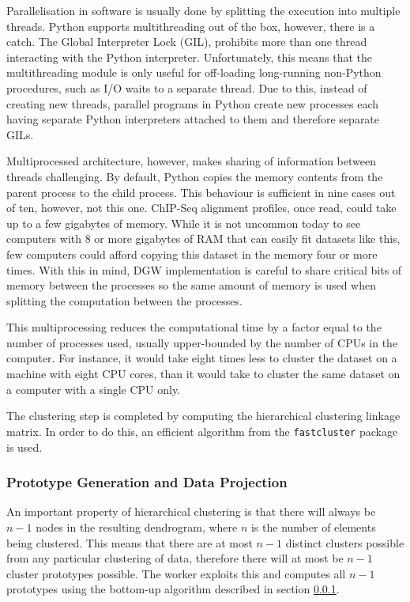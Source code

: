 \documentclass[parskip]{cs4rep}
\newcommand{\pythonpackage}[1]{{\tt #1}}
\begin{document}
Parallelisation in software is usually done by splitting the execution into multiple threads.
Python supports multithreading out of the box, however, there is a catch. The Global Interpreter Lock (GIL), prohibits more than one thread interacting with the Python interpreter. Unfortunately, this means that the multithreading module is only useful for off-loading long-running non-Python procedures, such as I/O waits to a separate thread. Due to this, instead of creating new threads, parallel programs in Python create new processes each having separate Python interpreters attached to them and therefore separate GILs.

Multiprocessed architecture, however, makes sharing of information between threads challenging.
By default, Python copies the memory contents from the parent process to the child process. This behaviour is sufficient in nine cases out of ten, however, not this one. ChIP-Seq alignment profiles, once read, could take up to a few gigabytes of memory. While it is not uncommon today to see computers with 8 or more gigabytes of RAM that can easily fit datasets like this, few computers could afford copying this dataset in the memory four or more times. With this in mind, DGW implementation is careful to share critical bits of memory between the processes so the same amount of memory is used when splitting the computation between the processes.

This multiprocessing reduces the computational time by a factor equal to the number of processes used, usually upper-bounded by the number of CPUs in the computer. For instance, it would take eight times less to cluster the dataset on a machine with eight CPU cores, than it would take to cluster the same 
dataset on a computer with a single CPU only. 

The clustering step is completed by computing the hierarchical clustering linkage matrix. In order to do this, an efficient 
algorithm from the \pythonpackage{fastcluster} package is used.

\subsubsection{Prototype Generation and Data Projection}
\label{sec:prototypes}

An important property of hierarchical clustering is that there will always be $n-1$ nodes in the resulting dendrogram, where $n$ is the number of elements being clustered. This means that there are at most $n-1$ distinct clusters possible from any particular clustering of data, therefore there will at most be $n-1$ cluster prototypes possible. The worker exploits this and computes all $n-1$ prototypes using the bottom-up algorithm described in section \ref{sec:prototypes}. 
\end{document}
